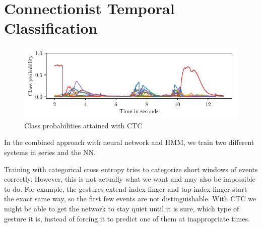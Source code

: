 \section{Connectionist Temporal Classification}
\label{sec:ctc}

\begin{figure}[h]
  \centering
  \includegraphics{figures/methods/ctc}
  \caption{Class probabilities attained with CTC}
  \label{fig:ctc-p}
\end{figure}

In the combined approach with neural network and HMM, we train two different
systems in series and the NN.

Training with categorical cross entropy tries to categorize short windows of events correctly.
However, this is not actually what we want and may also be impossible to do.
For example, the gestures extend-index-finger and tap-index-finger start the exact same way, so the first few events are not distinguishable.
With CTC we might be able to get the network to stay quiet until it is sure, which type of gesture it is, instead of forcing it to predict one of them at inappropriate times.


